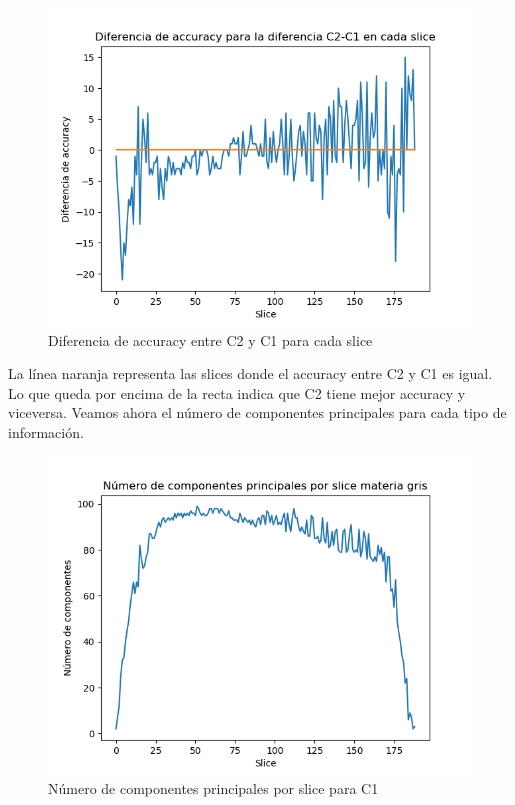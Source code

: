 \begin{figure}[H] %
	\centering
	\includegraphics[scale=0.7]{C2-C1.png}  %
	\caption{Diferencia de accuracy entre C2 y C1 para cada slice} 
	\label{fig:dif-c2-c1}
\end{figure}

La línea naranja representa las slices donde el accuracy entre C2 y C1 es igual. Lo que queda por encima de la recta indica que C2 tiene mejor accuracy y viceversa. Veamos ahora el número de componentes principales para cada tipo de información.

\begin{figure}[H] %
	\centering
	\includegraphics[scale=0.7]{pcc1.png}  %
	\caption{Número de componentes principales por slice para C1} 
	\label{fig:pcc1}
\end{figure}

